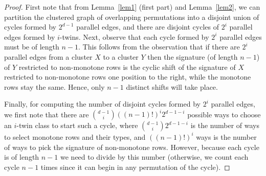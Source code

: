 \documentclass[12pt]{article}
\begin{document}
\begin{proof} First note that from Lemma~\ref{lem1} (first part) and Lemma~\ref{lem2}, we can partition the clustered graph of overlapping permutations   into a disjoint union of cycles formed by  $2^{d-1}$ parallel edges, and  there are disjoint cycles of $2^i$ parallel edges formed by $i$-twins. Next, observe that each cycle formed by $2^i$ parallel edges must be of length $n-1$. This follows from the observation that if there are $2^i$ parallel edges from a cluster $X$ to a cluster $Y$ then the signature (of length $n-1$) of $Y$ restricted to non-monotone rows is the cyclic shift of the signature of $X$ restricted to non-monotone rows one position to the right, while the monotone rows stay the same. Hence, only $n-1$ distinct shifts will take place. 

Finally, for computing the number of disjoint cycles formed by $2^i$ parallel edges, we  first note that there are  ${d-1\choose i}((n-1)!)^i2^{d-1-i}$ possible ways to choose an $i$-twin class to start such a cycle, where ${d-1\choose i}2^{d-1-i}$ is the number of ways to select monotone rows and their types, and $((n-1)!)^i$ ways is the number of ways to pick the signature of non-monotone rows. However, because each cycle is of length $n-1$ we need to divide by this number (otherwise, we count each cycle $n-1$ times since it can begin in any permutation of the cycle). 
\end{proof}
\end{document}
